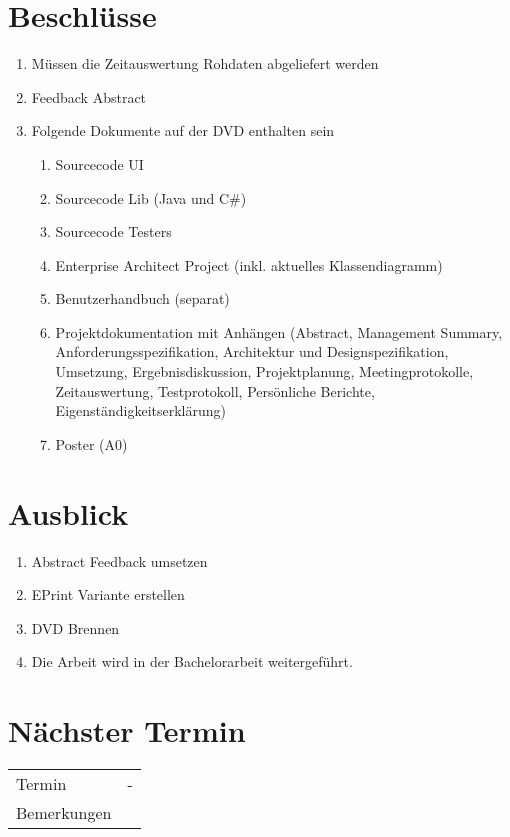 \documentclass[11pt, a4paper,oneside]{scrartcl}
\begin{document}
	\section{Beschlüsse}
	\begin{enumerate}
		\item Müssen die Zeitauswertung Rohdaten abgeliefert werden
		\item Feedback Abstract
		\item Folgende Dokumente auf der DVD enthalten sein
		\begin{enumerate}
			\item Sourcecode UI
			\item Sourcecode Lib (Java und C\#)
			\item Sourcecode Testers
			\item Enterprise Architect Project (inkl. aktuelles Klassendiagramm)
			\item Benutzerhandbuch (separat)
			\item Projektdokumentation mit Anhängen (Abstract, Management Summary, Anforderungsspezifikation, Architektur und Designspezifikation, Umsetzung, Ergebnisdiskussion, Projektplanung, Meetingprotokolle, Zeitauswertung, Testprotokoll, Persönliche Berichte, Eigenständigkeitserklärung)
			\item Poster (A0)
		\end{enumerate}
	\end{enumerate}
	
	\section{Ausblick}
	\begin{enumerate}
		\item Abstract Feedback umsetzen
		\item EPrint Variante erstellen
		\item DVD Brennen
		\item Die Arbeit wird in der Bachelorarbeit weitergeführt.
	\end{enumerate}
	
	\section{Nächster Termin}
	\begin{tabu} to \linewidth {l X }
		\toprule
		Termin & -  \\
		Bemerkungen &  \\
		\bottomrule
	\end{tabu}
	
\end{document}
